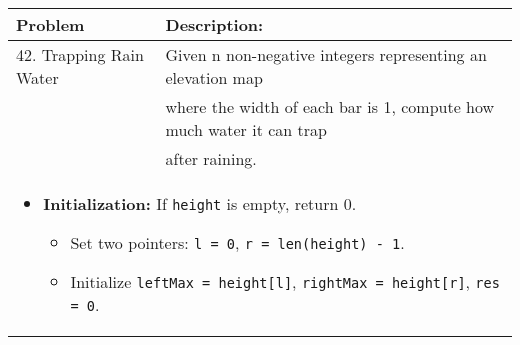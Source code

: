 \begin{summary}
    \begin{center}
        \begin{tabular}{ll}
            \toprule
            \textbf{Problem} & \textbf{Description:} \\
            \midrule
            42. Trapping Rain Water & Given n non-negative integers representing an elevation map \\
            & where the width of each bar is 1, compute how much water it can trap \\
            & after raining. \\
            \multicolumn{2}{p{\linewidth}}{
                \begin{itemize}
                    \item \textbf{Initialization:} If \texttt{height} is empty, return 0.
                    \begin{itemize}
                        \item Set two pointers: \texttt{l = 0}, \texttt{r = len(height) - 1}.
                        \item Initialize \texttt{leftMax = height[l]}, \texttt{rightMax = height[r]}, \texttt{res = 0}.
                    \end{itemize}
                

\end{itemize}}
\end{tabular}
\end{center}
\end{summary}
